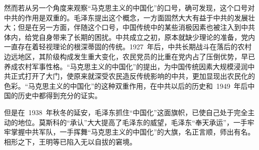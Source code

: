 然而若从另一个角度来观察“马克思主义的中国化”的口号，确可发现，这个口号对中共的作用是双重的。毛泽东提出这个概念，一方面固然大大有益于中共的发展壮大；但是在另一方面，伴随这个口号，中国传统中的某些消极因素也被注入到中共体内，给党自身带来了长期的困扰。中共成立之初，原本就缺少理论的准备，党内一直存在着轻视理论的根深蒂固的传统。1927~年后，中共长期战斗在落后的农村边远地区，其阶级构成发生重大变化，农民党员的比重在党内占了压倒优势，早已养成农村军事性格。“马克思主义的中国化”的提出，为中国传统因素大规模浸润中共正式打开了大门，使原来就深受农民造反传统影响的中共，更加显现出农民化的色彩。“马克思主义的中国化”的这种双重作用，在中共以后的历史和~1949~年后中国的历史中都得到充分的证实。

但是在~1938~年秋冬的延安，毛泽东抓住“中国化”这面旗帜，已使自己处于完全主动的地位。莫斯科的“承认”大大提高了毛泽东的威望，毛泽东“奉天承运”，一手牢牢掌握中共军队，一手挥舞“马克思主义的中国化”的大旗，名正言顺，师出有名。相形之下，王明等已陷入无以自拔的窘境。

